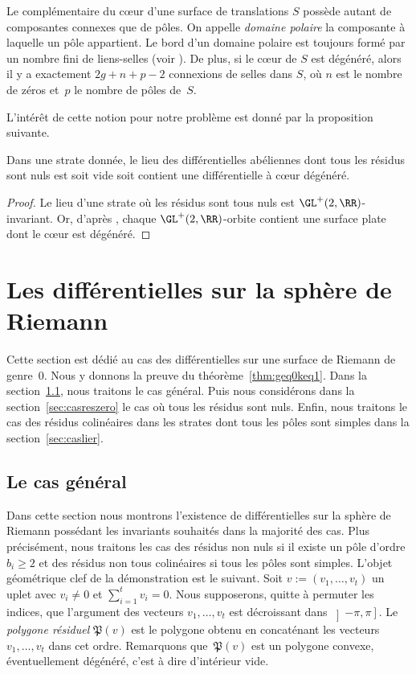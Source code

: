 Le complémentaire du cœur d'une surface de translations $S$ possède autant de composantes connexes que de pôles. On appelle \textit{domaine polaire} la composante à laquelle un pôle appartient. Le bord d'un domaine polaire est toujours formé par un nombre fini de liens-selles (voir \cite[Lem.\,2.1]{tahar}). De plus, si le cœur de $S$ est dégénéré, alors il y a exactement $2g+n+p-2$ connexions de selles dans $S$, où $n$ est le nombre de zéros et~$p$ le nombre de pôles de~$S$.

L'intérêt de cette notion pour notre problème est donné par la proposition suivante.
\begin{prop}\label{prop:coeurdege}
Dans une strate donnée, le lieu des différentielles abéliennes dont tous les résidus sont nuls est soit vide soit contient une différentielle à cœur dégénéré.
\end{prop}

\begin{proof}
Le lieu d'une strate où les résidus sont tous nuls est $\GL^{+}(2,\RR)$-invariant. Or, d'après \cite[Lem.\,2.2]{tahar}, chaque $\GL^{+}(2,\RR)$-orbite contient une surface plate dont le cœur est dégénéré.
\end{proof}

\section{Les différentielles sur la sphère de Riemann}
\label{sec:g0}

Cette section est dédié au cas des différentielles sur une surface de Riemann de genre~$0$. Nous y donnons la preuve du théorème~\ref{thm:geq0keq1}. Dans la section~\ref{sec:geng0}, nous traitons le cas général. Puis nous considérons dans la section~\ref{sec:casreszero} le cas où tous les résidus sont nuls. Enfin, nous traitons le cas des résidus colinéaires dans les strates dont tous les pôles sont simples dans la section~\ref{sec:caslier}.\enlargethispage{\baselineskip}%

\subsection{Le cas général}
\label{sec:geng0}
Dans cette section nous montrons l'existence de différentielles sur la sphère de Riemann possédant les invariants souhaités dans la majorité des cas. Plus précisément, nous traitons les cas des résidus non nuls si il existe un pôle d'ordre $b_{i}\geq2$ et des résidus non tous colinéaires si tous les pôles sont simples.
L'objet géométrique clef de la démonstration est le suivant. Soit $v:=(v_1,\ldots, v_{t})$ un uplet avec $v_{i}\neq 0$ et $\sum_{i=1}^{t}v_{i}=0$. Nous supposerons, quitte à permuter les indices, que l'argument des vecteurs $v_{1},\ldots,v_{t}$ est décroissant dans $\left]-\pi,\pi\right]$.
Le \emph{polygone résiduel } $\mathfrak{P}(v)$ est le polygone obtenu en concaténant les vecteurs $v_{1}, \ldots,v_{t}$ dans cet ordre. Remarquons que~$\mathfrak{P}(v)$ est un polygone convexe, éventuellement dégénéré, c'est à dire d'intérieur vide.

